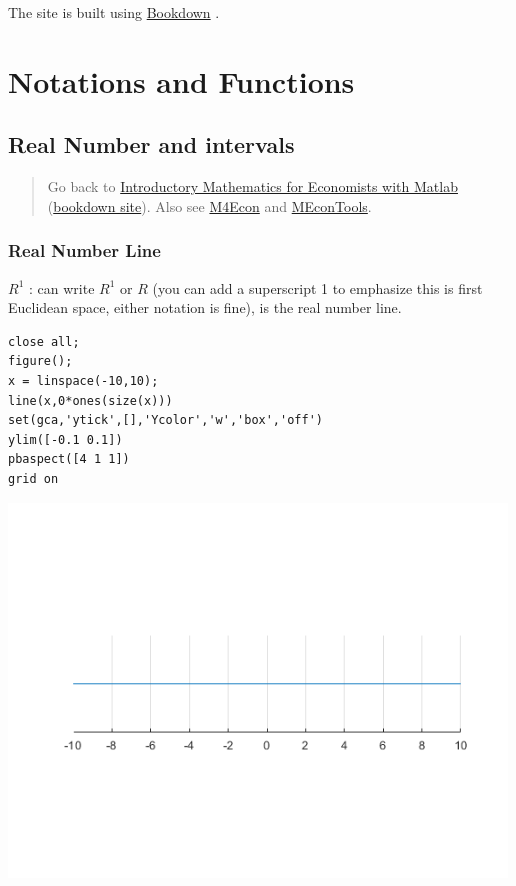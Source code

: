 \documentclass[
]{book}
\begin{document}
The site is built using \href{https://bookdown.org/}{Bookdown} \citep{R-bookdown}.

\hypertarget{notations-and-functions}{%
\chapter{Notations and Functions}\label{notations-and-functions}}

\hypertarget{real-number-and-intervals}{%
\section{Real Number and intervals}\label{real-number-and-intervals}}

\begin{quote}
Go back to \href{https://math4econ.github.io/}{Introductory Mathematics for Economists with Matlab} (\href{https://math4econ.github.io/bookdown}{bookdown site}). Also see \href{http://fanwangecon.github.io/M4Econ}{M4Econ} and \href{https://fanwangecon.github.io/MEconTools/}{MEconTools}.
\end{quote}

\hypertarget{real-number-line}{%
\subsection{Real Number Line}\label{real-number-line}}

\({R^1 }\) : can write \(R^1\) or \(R\) (you can add a superscript 1 to
emphasize this is first Euclidean space, either notation is fine), is
the real number line.

\begin{verbatim}
close all;
figure();
x = linspace(-10,10);
line(x,0*ones(size(x)))
set(gca,'ytick',[],'Ycolor','w','box','off')
ylim([-0.1 0.1])
pbaspect([4 1 1])
grid on
\end{verbatim}

\includegraphics[width=5.20833in,height=\textheight]{img/realnumber_images/figure_0.png}
\end{document}
